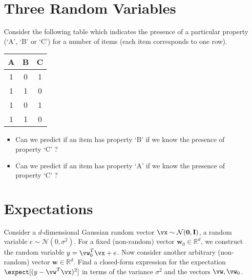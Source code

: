 \documentclass[article,11pt]{article}
\begin{document}
\newpage
\section{Three Random Variables}
Consider the following table which indicates the presence of a particular property 
(`A', `B' or `C') for a number of items (each item corresponds to one row). 

\begin{tabular}{c|c|c}
\hline\hline
A & B & C \\ [0.5ex] %
\hline
1 & 0 & 1\\
1 & 1 & 0 \\
1 & 0 & 1 \\
1 & 1 & 0 \\
\hline
\end{tabular}

\begin{itemize}
\item Can we predict if an item has property `B' if we know the presence of property `C' ?
\item Can we predict if an item has property `A' if we know the presence of property `C' ?
\end{itemize} 

\newpage
\section{Expectations}
Consider a $d$-dimensional Gaussian random vector $\vx \sim \mathcal{N}(\mathbf{0},\mathbf{I})$, 
a random variable $e \sim \mathcal{N}(0,\sigma^{2})$. 
For a fixed (non-random) vector $\mathbf{w}_{0} \in \mathbb{R}^{d}$, we construct the random variable $y= \vw_{0}^{T} \vx + e$. 
Now consider another arbitrary (non-random) vector $\mathbf{w} \in \mathbb{R}^{d}$. 
Find a closed-form expression for the expectation $\expect [ ( y - \vw^{T} \vx )^{2} ]$ in terms of the variance $\sigma^{2}$ and the vectors $\vw, \vw_{0}$. 
\end{document}
